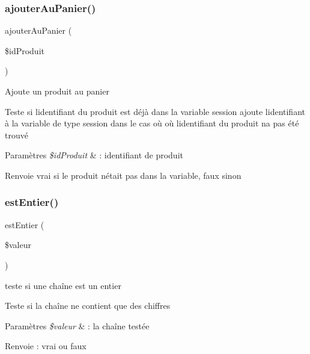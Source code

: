 \subsubsection{\texorpdfstring{ajouter\+Au\+Panier()}{ajouterAuPanier()}}
{\footnotesize\ttfamily ajouter\+Au\+Panier (\begin{DoxyParamCaption}\item[{}]{\$id\+Produit }\end{DoxyParamCaption})}

Ajoute un produit au panier

Teste si l\textquotesingle{}identifiant du produit est déjà dans la variable session ajoute l\textquotesingle{}identifiant à la variable de type session dans le cas où où l\textquotesingle{}identifiant du produit n\textquotesingle{}a pas été trouvé 
\begin{DoxyParams}{Paramètres}
{\em \$id\+Produit} & \+: identifiant de produit \\
\hline
\end{DoxyParams}
\begin{DoxyReturn}{Renvoie}
vrai si le produit n\textquotesingle{}était pas dans la variable, faux sinon 
\end{DoxyReturn}
\mbox{\label{fonctions_8inc_8php_af8cba6b0c8902dc65b7522b5952b30bf}} 
\subsubsection{\texorpdfstring{est\+Entier()}{estEntier()}}
{\footnotesize\ttfamily est\+Entier (\begin{DoxyParamCaption}\item[{}]{\$valeur }\end{DoxyParamCaption})}

teste si une chaîne est un entier

Teste si la chaîne ne contient que des chiffres 
\begin{DoxyParams}{Paramètres}
{\em \$valeur} & \+: la chaîne testée \\
\hline
\end{DoxyParams}
\begin{DoxyReturn}{Renvoie}
\+: vrai ou faux 
\end{DoxyReturn}
\mbox{\label{fonctions_8inc_8php_a84de5caad41b5a853d48722806e001f6}} 
